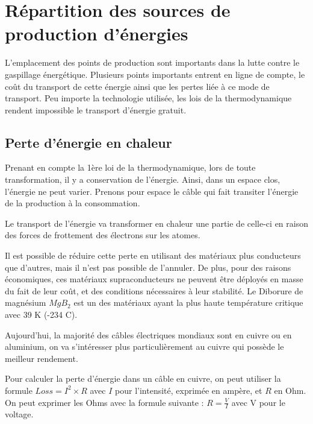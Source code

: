 \chapter{Répartition des sources de production d'énergies}

L'emplacement des points de production sont importants dans la lutte contre le gaspillage énergétique.
Plusieurs points importants entrent en ligne de compte, le coût du transport de cette énergie ainsi que les pertes liée à ce mode de transport.
Peu importe la technologie utilisée, les lois de la thermodynamique rendent impossible le transport d'énergie gratuit.

\section{Perte d'énergie en chaleur}

Prenant en compte la 1ère loi de la thermodynamique, lors de toute transformation, il y a
conservation de l'énergie.
Ainsi, dans un espace clos, l'énergie ne peut varier.
Prenons pour espace le câble qui fait transiter l'énergie de la production à la consommation.

Le transport de l'énergie va transformer en chaleur une partie de celle-ci en raison
des forces de frottement des électrons sur les atomes.

Il est possible de réduire cette perte en utilisant des matériaux plus conducteurs que
d'autres, mais il n'est pas possible de l'annuler.
De plus, pour des raisons économiques, ces matériaux supraconducteurs ne peuvent être
déployés en masse du fait de leur coût, et des conditions nécessaires à leur stabilité.
Le Diborure de magnésium $MgB_2$ est un des matériaux ayant la plus haute température
critique avec 39 K (-234 C).

Aujourd'hui, la majorité des câbles électriques mondiaux sont en cuivre ou en aluminium,
on va s'intéresser plus particulièrement au cuivre qui possède le meilleur rendement.

Pour calculer la perte d'énergie dans un câble en cuivre, on peut utiliser la formule $Loss = I^2\times R$ avec $I$ pour l'intensité, exprimée en ampère, et $R$ en Ohm.
On peut exprimer les Ohms avec la formule suivante : $R = \frac{V}{I}$ avec V pour le voltage.


